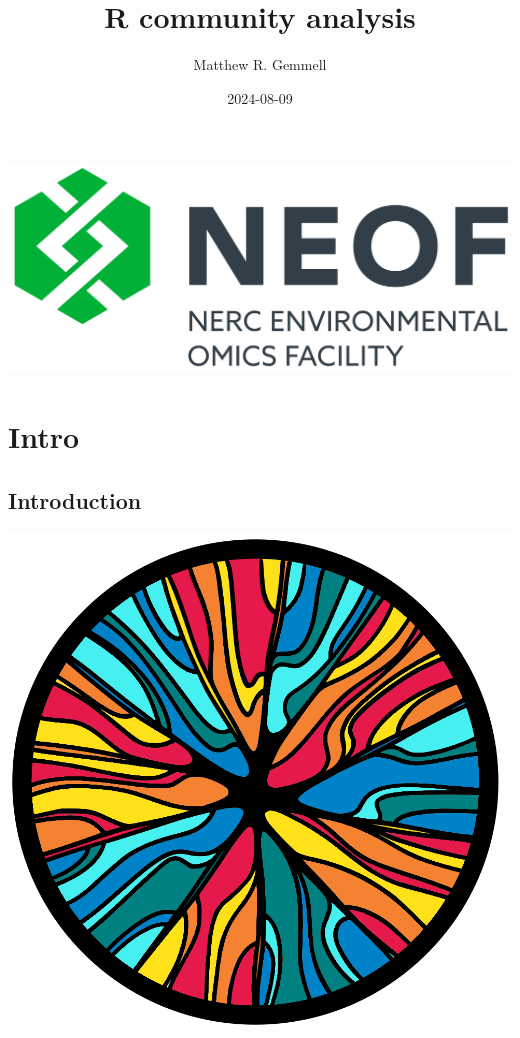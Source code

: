 \documentclass[
]{book}
\title{R community analysis}
\author{Matthew R. Gemmell}
\date{2024-08-09}
\begin{document}
\maketitle

{
\setcounter{tocdepth}{1}
\tableofcontents
}
\includegraphics{figures/NEOF.png}

\hypertarget{part-intro}{%
\part*{Intro}\label{part-intro}}

\hypertarget{introduction}{%
\chapter{Introduction}\label{introduction}}

\includegraphics{figures/R_community.png}
\end{document}

